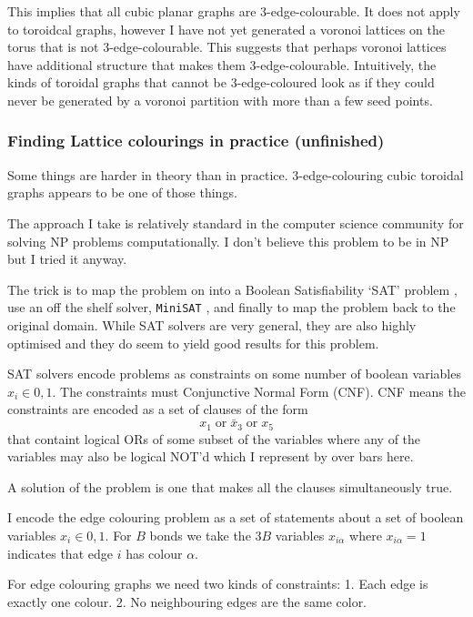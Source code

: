 This implies that all cubic planar graphs are 3-edge-colourable. It does
not apply to toroidcal graphs, however I have not yet generated a
voronoi lattices on the torus that is not 3-edge-colourable. This
suggests that perhaps voronoi lattices have additional structure that
makes them 3-edge-colourable. Intuitively, the kinds of toroidal graphs
that cannot be 3-edge-coloured look as if they could never be generated
by a voronoi partition with more than a few seed points.

\hypertarget{finding-lattice-colourings-in-practice-unfinished}{%
\subsubsection{Finding Lattice colourings in practice
(unfinished)}\label{finding-lattice-colourings-in-practice-unfinished}}

Some things are harder in theory than in practice. 3-edge-colouring
cubic toroidal graphs appears to be one of those things.

The approach I take is relatively standard in the computer science
community for solving NP problems computationally. I don't believe this
problem to be in NP but I tried it anyway.

The trick is to map the problem on into a Boolean Satisfiability `SAT'
problem \autocite{Karp1972}, use an off the shelf solver,
\texttt{MiniSAT} \autocite{imms-sat18}, and finally to map the problem
back to the original domain. While SAT solvers are very general, they
are also highly optimised and they do seem to yield good results for
this problem.

SAT solvers encode problems as constraints on some number of boolean
variables \(x_i \in {0,1}\). The constraints must Conjunctive Normal
Form (CNF). CNF means the constraints are encoded as a set of clauses of
the form \[x_1 \;\textrm{or}\; \bar{x}_3 \;\textrm{or}\; x_5\] that
containt logical ORs of some subset of the variables where any of the
variables may also be logical NOT'd which I represent by over bars here.

A solution of the problem is one that makes all the clauses
simultaneously true.

I encode the edge colouring problem as a set of statements about a set
of boolean variables \(x_i \in {0,1}\). For \(B\) bonds we take the
\(3B\) variables \(x_{i\alpha}\) where \(x_{i\alpha} = 1\) indicates
that edge \(i\) has colour \(\alpha\).

For edge colouring graphs we need two kinds of constraints: 1. Each edge
is exactly one colour. 2. No neighbouring edges are the same color.

